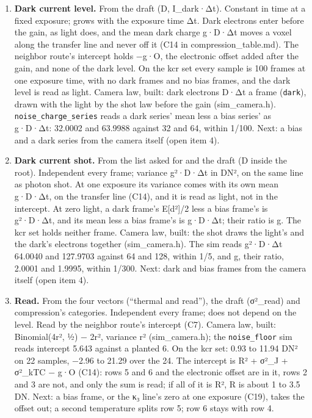 \begin{enumerate}
\begin{itemize}
\end{itemize}
\item \textbf{Dark current level.} From the draft (D, I\_\allowbreak{}dark·Δt). Constant in time at a fixed exposure; grows with the exposure time Δt. Dark electrons enter before the gain, as light does, and the mean dark charge g·D·Δt moves a voxel along the transfer line and never off it (C14 in compression\_\allowbreak{}table.md). The neighbor route's intercept holds −g·O, the electronic offset added after the gain, and none of the dark level. On the kcr set every sample is 100 frames at one exposure time, with no dark frames and no bias frames, and the dark level is read as light. Camera law, built: dark electrons D·Δt a frame (\texttt{dark}), drawn with the light by the shot law before the gain (sim\_\allowbreak{}camera.h). \texttt{noise\_\allowbreak{}charge\_\allowbreak{}series} reads a dark series' mean less a bias series' as g·D·Δt: 32.0002 and 63.9988 against 32 and 64, within 1/100. Next: a bias and a dark series from the camera itself (open item 4).
\item \textbf{Dark current shot.} From the list asked for and the draft (D inside the root). Independent every frame; variance g²·D·Δt in DN², on the same line as photon shot. At one exposure its variance comes with its own mean g·D·Δt, on the transfer line (C14), and it is read as light, not in the intercept. At zero light, a dark frame's E[d²]/2 less a bias frame's is g²·D·Δt, and its mean less a bias frame's is g·D·Δt; their ratio is g. The kcr set holds neither frame. Camera law, built: the shot draws the light's and the dark's electrons together (sim\_\allowbreak{}camera.h). The sim reads g²·D·Δt 64.0040 and 127.9703 against 64 and 128, within 1/5, and g, their ratio, 2.0001 and 1.9995, within 1/300. Next: dark and bias frames from the camera itself (open item 4).
\item \textbf{Read.} From the four vectors (“thermal and read”), the draft (σ²\_\allowbreak{}read) and compression's categories. Independent every frame; does not depend on the level. Read by the neighbor route's intercept (C7). Camera law, built: Binomial(4r², ½) − 2r², variance r² (sim\_\allowbreak{}camera.h); the \texttt{noise\_\allowbreak{}floor} sim reads intercept 5.643 against a planted 6. On the kcr set: 0.93 to 11.94 DN² on 22 samples, −2.96 to 21.29 over the 24. The intercept is R² + σ²\_\allowbreak{}J + σ²\_\allowbreak{}kTC − g·O (C14): rows 5 and 6 and the electronic offset are in it, rows 2 and 3 are not, and only the sum is read; if all of it is R², R is about 1 to 3.5 DN. Next: a bias frame, or the κ₃ line's zero at one exposure (C19), takes the offset out; a second temperature splits row 5; row 6 stays with row 4.

\end{enumerate}
